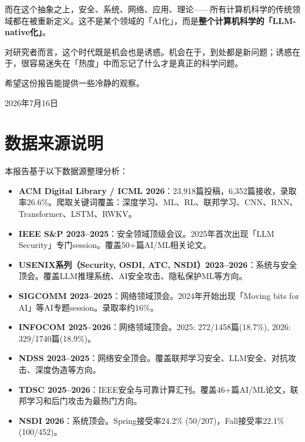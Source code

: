 \documentclass[12pt,a4paper]{ctexart}
\begin{document}
而在这个抽象之上，安全、系统、网络、应用、理论——所有计算机科学的传统领域都在被重新定义。这不是某个领域的「AI化」，而是\textbf{整个计算机科学的「LLM-native化」}。

对研究者而言，这个时代既是机会也是诱惑。机会在于，到处都是新问题；诱惑在于，很容易迷失在「热度」中而忘记了什么才是真正的科学问题。

希望这份报告能提供一些冷静的观察。

\vspace{12pt}
\begin{flushright}
\small 2026年7月16日
\end{flushright}

\appendix
\section{数据来源说明}

本报告基于以下数据源整理分析：

\begin{itemize}[leftmargin=*]
    \item \textbf{ACM Digital Library / ICML 2026}：23,918篇投稿，6,352篇接收，录取率26.6\%。爬取关键词覆盖：深度学习、ML、RL、联邦学习、CNN、RNN、Transformer、LSTM、RWKV。
    \item \textbf{IEEE S\&P 2023--2025}：安全领域顶级会议。2025年首次出现「LLM Security」专门session。覆盖50+篇AI/ML相关论文。
    \item \textbf{USENIX系列（Security, OSDI, ATC, NSDI）2023--2026}：系统与安全顶会。覆盖LLM推理系统、AI安全攻击、隐私保护ML等方向。
    \item \textbf{SIGCOMM 2023--2025}：网络领域顶会。2024年开始出现「Moving bits for AI」等AI专题session。录取率约16\%。
    \item \textbf{INFOCOM 2025--2026}：网络领域顶会。2025: 272/1458篇(18.7\%), 2026: 329/1740篇(18.9\%)。
    \item \textbf{NDSS 2023--2025}：网络安全顶会。覆盖联邦学习安全、LLM安全、对抗攻击、深度伪造等方向。
    \item \textbf{TDSC 2025--2026}：IEEE安全与可靠计算汇刊。覆盖46+篇AI/ML论文，联邦学习和后门攻击为最热门方向。
    \item \textbf{NSDI 2026}：系统顶会。Spring接受率24.2\% (50/207)，Fall接受率22.1\% (100/452)。
\end{itemize}
\end{document}
